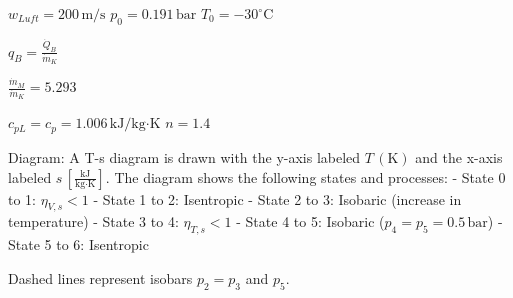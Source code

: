 \( w_{Luft} = 200 \, \text{m/s} \)  
\( p_0 = 0.191 \, \text{bar} \)  
\( T_0 = -30^\circ \text{C} \)  

\( q_B = \frac{\dot{Q}_B}{\dot{m}_K} \)  

\( \frac{\dot{m}_M}{\dot{m}_K} = 5.293 \)  

\( c_{pL} = c_p = 1.006 \, \text{kJ/kg·K} \)  
\( n = 1.4 \)  

Diagram:  
A T-s diagram is drawn with the y-axis labeled \( T \, (\text{K}) \) and the x-axis labeled \( s \, \left[ \frac{\text{kJ}}{\text{kg·K}} \right] \).  
The diagram shows the following states and processes:  
- State 0 to 1: \( \eta_{V,s} < 1 \)  
- State 1 to 2: Isentropic  
- State 2 to 3: Isobaric (increase in temperature)  
- State 3 to 4: \( \eta_{T,s} < 1 \)  
- State 4 to 5: Isobaric (\( p_4 = p_5 = 0.5 \, \text{bar} \))  
- State 5 to 6: Isentropic  

Dashed lines represent isobars \( p_2 = p_3 \) and \( p_5 \).